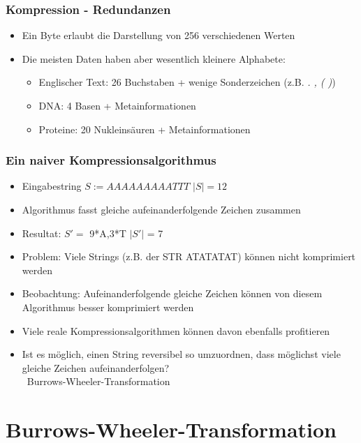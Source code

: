 \documentclass[14pt,xcolor=dvipsnames,pdftex]{beamer}
\begin{document}
\begin{frame}[allowframebreaks]
 \frametitle{Kompression - Redundanzen}
 \begin{itemize}
  \item Ein Byte erlaubt die Darstellung von 256 verschiedenen Werten
  \item Die meisten Daten haben aber wesentlich kleinere Alphabete:
  \begin{itemize}
   \item Englischer Text: 26 Buchstaben + wenige Sonderzeichen (z.B. \textit{. , ( )})
   \item DNA: 4 Basen + Metainformationen
   \item Proteine: 20 Nukleinsäuren + Metainformationen
  \end{itemize}
 \end{itemize}
\end{frame}
\begin{frame}[allowframebreaks]
\frametitle{Ein naiver Kompressionsalgorithmus}
\begin{itemize}
 \item Eingabestring $S := AAAAAAAAATTT$ \textrightarrow $|S| = 12$
 \item Algorithmus fasst gleiche aufeinanderfolgende Zeichen zusammen
 \item Resultat: $S' = $ 9*A,3*T \textrightarrow $|S'|$ = 7
 \item Problem: Viele Strings (z.B. der STR ATATATAT) können nicht komprimiert werden
\end{itemize}
\framebreak
\begin{itemize}
 \item Beobachtung: Aufeinanderfolgende gleiche Zeichen können von diesem Algorithmus besser komprimiert werden
 \item Viele reale Kompressionsalgorithmen können davon ebenfalls profitieren\vspace{3mm}
 \item Ist es möglich, einen String reversibel so umzuordnen, dass möglichst viele gleiche Zeichen aufeinanderfolgen?\\
 \textrightarrow\ Burrows-Wheeler-Transformation
\end{itemize}
\end{frame}

\section{Burrows-Wheeler-Transformation}
\end{document}
